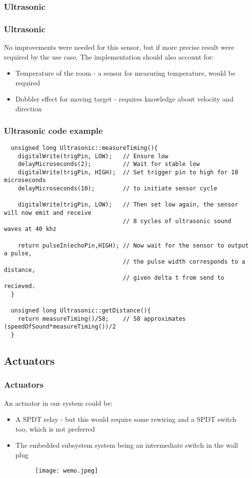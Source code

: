 \subsubsection{Ultrasonic}
\begin{frame}
	\frametitle{Ultrasonic}
	No improvements were needed for this sensor, but if more precise result were required by the use case.
	The implementation should also account for:
	\begin{itemize}
    \item Temperature of the room - a sensor for measuring temperature, would be required
    \item Dobbler effect for moving target - requires knowledge about velocity and direction
	\end{itemize}
\end{frame}
\begin{frame}[fragile]
	\frametitle{Ultrasonic code example}
	\begin{lstlisting}   
  unsigned long Ultrasonic::measureTiming(){
    digitalWrite(trigPin, LOW);   // Ensure low
    delayMicroseconds(2);         // Wait for stable low
    digitalWrite(trigPin, HIGH);  // Set trigger pin to high for 10 microseconds
    delayMicroseconds(10);        // to initiate sensor cycle

    digitalWrite(trigPin, LOW);   // Then set low again, the sensor will now emit and receive
                                  // 8 cycles of ultrasonic sound waves at 40 khz

    return pulseIn(echoPin,HIGH); // Now wait for the sensor to output a pulse,
                                  // the pulse width corresponds to a distance,
                                  // given delta t from send to recieved.
  }
  
  unsigned long Ultrasonic::getDistance(){
    return measureTiming()/58;    // 58 approximates (speedOfSound*measureTiming())/2
  }
	\end{lstlisting}
\end{frame}
\subsection{Actuators}
\begin{frame}
	\frametitle{Actuators}
	An actuator in our system could be:
	\begin{itemize}
		\item A SPDT relay - but this would require some rewiring and a SPDT switch too, which is not preferred
		\item The embedded subsystem system being an intermediate switch in the wall plug
		\begin{figure}[htbp]
		    \centering
        \texttt{[image: wemo.jpeg]}
		\end{figure}
	\end{itemize}
\end{frame}
